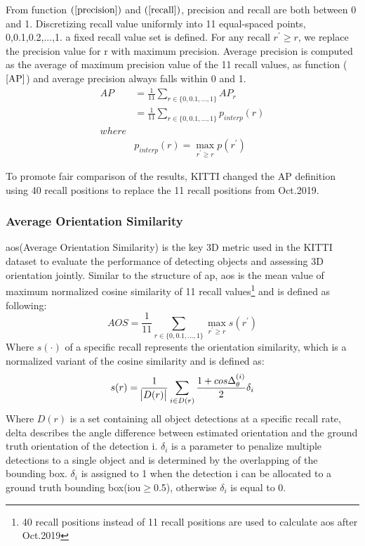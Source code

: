 From function \((\ref{precision})\) and \((\ref{recall})\), precision and recall are both between 0 and 1. Discretizing recall value uniformly into 11 equal-spaced points, 0,0.1,0.2,...,1. a fixed recall value set is defined. For any recall \(r^{'}\geq r\), we replace the precision value for r with maximum precision. Average precision is computed as the average of maximum precision value of the 11 recall values\cite{everingham_pascal_2010}, as function (\(\ref{AP}\)) and average precision always falls within 0 and 1.
\begin{equation}
\label{AP}
\begin{split}
    AP &= \frac{1}{11} \sum\limits_{r\in\{{0,0.1,...,1}\}} AP_{r} \\
    &=\frac{1}{11} \sum\limits_{r\in\{{0,0.1,...,1}\}} p_{interp}(r)\\
    where  \\
    &p_{interp}(r) = \max\limits_{r^{'}\geq r}p(r^{'})
\end{split}
\end{equation}
 
To promote fair comparison of the results, KITTI changed the AP definition using 40 recall positions to replace the 11 recall positions from Oct.2019\cite{KITTI,simonelli_disentangling_2019}. 
\subsubsection{Average Orientation Similarity}
\acrshort{aos}(Average Orientation Similarity) is the key 3D metric used in the KITTI dataset to evaluate the performance of detecting objects and assessing 3D orientation jointly\cite{geiger_are_2012}. Similar to the structure of \acrshort{ap}, \acrshort{aos} is the mean value of maximum normalized cosine similarity of 11 recall values\footnote{40 recall positions instead of 11 recall positions are used to calculate \acrshort{aos} after Oct.2019} and is defined as following:
\begin{equation}
    AOS = \frac{1}{11} \sum\limits_{r\in\{{0,0.1,...,1}\}}  \max\limits_{r^{'}\geq r}s(r^{'})
\end{equation}
Where \(s(\cdot)\) of a specific recall represents the orientation similarity, which is a normalized variant of the cosine similarity and is defined as:
\begin{equation}
    s(r) = \frac{1}{\abs{ D(r)}} \sum\limits_{i\in D(r)}  \frac{1+cos\Delta_{\theta}^{(i)}}{2} \delta_{i}
\end{equation}
Where \(D(r)\) is a set containing all object detections at a specific recall rate, delta describes the angle difference between estimated orientation and the ground truth orientation of the detection i. \(\delta_{i}\) is a parameter to penalize multiple detections to a single object and is determined by the overlapping of the bounding box. \(\delta_{i}\) is assigned to 1 when the detection i can be allocated to a ground truth bounding box(\acrshort{iou}\(\geq\)0.5), otherwise \(\delta_{i}\) is equal to 0.




